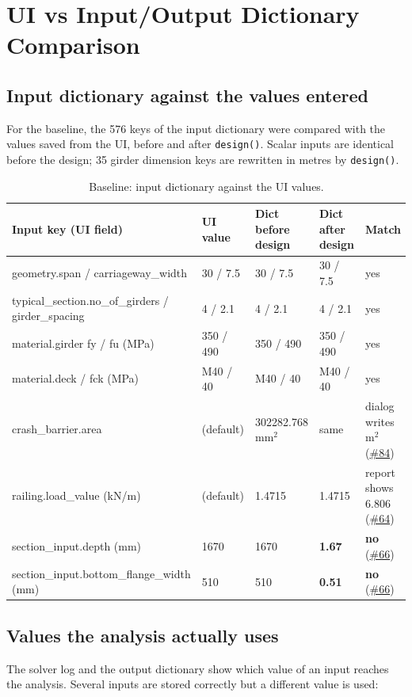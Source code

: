 \documentclass[10pt,a4paper]{article}
\newcommand{\gh}[1]{\href{https://github.com/Nidhikhare12/OsdagBridge/issues/#1}{\##1}}
\newcommand{\no}{\textcolor{failc}{\textbf{no}}}
\begin{document}
\section{UI vs Input/Output Dictionary Comparison}
\subsection{Input dictionary against the values entered}
For the baseline, the 576 keys of the input dictionary were compared with the values saved from the UI, before and after \texttt{design()}. Scalar inputs are identical before the design; 35 girder dimension keys are rewritten in metres by \texttt{design()}.

\begin{table}[H]
\centering\small
\begin{tabular}{@{}L{5.6cm}L{2.2cm}L{2.3cm}L{2.2cm}L{3.6cm}@{}}
\toprule
\textbf{Input key (UI field)} & \textbf{UI value} & \textbf{Dict before design} & \textbf{Dict after design} & \textbf{Match}\\
\midrule
geometry.span / carriageway\_width & 30 / 7.5 & 30 / 7.5 & 30 / 7.5 & yes\\
typical\_section.no\_of\_girders / girder\_spacing & 4 / 2.1 & 4 / 2.1 & 4 / 2.1 & yes\\
material.girder fy / fu (MPa) & 350 / 490 & 350 / 490 & 350 / 490 & yes\\
material.deck / fck (MPa) & M40 / 40 & M40 / 40 & M40 / 40 & yes\\
crash\_barrier.area & (default) & 302282.768 mm$^2$ & same & dialog writes m$^2$ (\gh{84})\\
railing.load\_value (kN/m) & (default) & 1.4715 & 1.4715 & report shows 6.806 (\gh{64})\\
section\_input.depth (mm) & 1670 & 1670 & \textbf{1.67} & \no{} (\gh{66})\\
section\_input.bottom\_flange\_width (mm) & 510 & 510 & \textbf{0.51} & \no{} (\gh{66})\\
\bottomrule
\end{tabular}
\caption{Baseline: input dictionary against the UI values.}
\end{table}

\subsection{Values the analysis actually uses}
The solver log and the output dictionary show which value of an input reaches the analysis. Several inputs are stored correctly but a different value is used:
\end{document}
